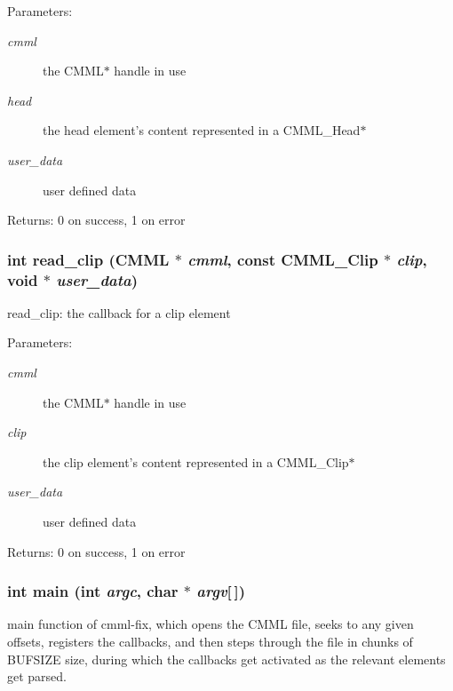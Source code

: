 \begin{Desc}
\item[Parameters:]
\begin{description}
\item[{\em cmml}]the CMML$\ast$ handle in use \item[{\em head}]the head element's content represented in a CMML\_\-Head$\ast$ \item[{\em user\_\-data}]user defined data\end{description}
\end{Desc}
\begin{Desc}
\item[Returns:]0 on success, 1 on error \end{Desc}
\subsubsection{\setlength{\rightskip}{0pt plus 5cm}int read\_\-clip ({\bf CMML} $\ast$ {\em cmml}, const {\bf CMML\_\-Clip} $\ast$ {\em clip}, void $\ast$ {\em user\_\-data})\hspace{0.3cm}{\tt  [static]}}\label{cmml-fix_8c_a5}


read\_\-clip: the callback for a clip element

\begin{Desc}
\item[Parameters:]
\begin{description}
\item[{\em cmml}]the CMML$\ast$ handle in use \item[{\em clip}]the clip element's content represented in a CMML\_\-Clip$\ast$ \item[{\em user\_\-data}]user defined data\end{description}
\end{Desc}
\begin{Desc}
\item[Returns:]0 on success, 1 on error \end{Desc}
\subsubsection{\setlength{\rightskip}{0pt plus 5cm}int main (int {\em argc}, char $\ast$ {\em argv}[$\,$])}\label{cmml-fix_8c_a6}


main function of cmml-fix, which opens the CMML file, seeks to any given offsets, registers the callbacks, and then steps through the file in chunks of BUFSIZE size, during which the callbacks get activated as the relevant elements get parsed. 

